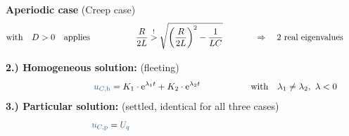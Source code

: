 \begin{frame}[t]
{\textbf{Aperiodic case} (Creep case)%
}%
\ifvmode\vspace*{-\baselineskip}\setlength{\parskip}{4pt}\fi%
\begin{align*}%
    &\text{with}\quad D > 0 \quad\text{applies}&
        &\phantom{\mathrel{\phantom{=}}-}\frac{R}{2L} \overset{!}{>} \sqrt{\left(\frac{R}{2L}\right)^2 - \frac{1}{LC}}
            &&\Rightarrow\quad \text{2 real eigenvalues}
    \\[-10pt] &\hphantom{1rrrrrrrrrrrrrrrr} &   \hphantom{2llllll}&\hphantom{\mathrel{\phantom{=}}2rrrrrrrrrrrrrrrrrrrrrrrrrrr}     &&\hphantom{3rrrrrrrrrrrrrrrrrrrrrrrr} \nonumber
\end{align*}%
\pause%
\textbf{2.) Homogeneous solution:} (fleeting)
\begin{align}%
    &&
        \ecv{u_{C,\mathrm{h}}} &= K_1 \cdot \mathrm{e}^{\lambda_1 t} + K_2 \cdot \mathrm{e}^{\lambda_2 t}
            &&\text{with}\quad \lambda_1 \neq \lambda_2,\ \lambda <  0  \label{eq:dgl:rlc:homolsg:aperiodisch}
    \\[-15pt] &\hphantom{1rrrrrrrrrrrrrrrr} &   \hphantom{2llllll}&\hphantom{\mathrel{\phantom{=}}2rrrrrrrrrrrrrrrrrrrrrrrrrrr}     &&\hphantom{3rrrrrrrrrrrrrrrrrrrrrrrr} \nonumber
\end{align}%
%
\textbf{3.) Particular solution:} (settled, identical for all three cases)%
\begin{align*}
    &&
        \ecv{u_{C,\mathrm{p}}} &= \ecv{U_q}
        \\[-15pt] &\hphantom{1rrrrrrrrrrrrrrrr} &   \hphantom{2llllll}&\hphantom{\mathrel{\phantom{=}}2rrrrrrrrrrrrrrrrrrrrrrrrrrr}     &&\hphantom{3rrrrrrrrrrrrrrrrrrrrrrrr} \nonumber
    \end{align*}%
\end{frame}%
